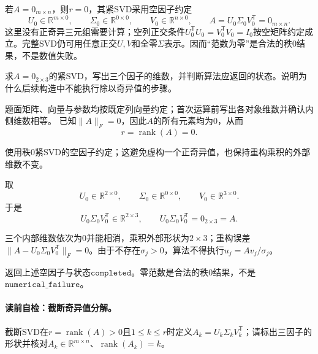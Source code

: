 \begin{definition}\label{def:V4-C03-rank-zero-svd}
若$A=0_{m\times n}$，则$r=0$，其紧SVD采用空因子约定
\[
U_0\in\mathbb R^{m\times0},\qquad
\Sigma_0\in\mathbb R^{0\times0},\qquad
V_0\in\mathbb R^{n\times0},\qquad
A=U_0\Sigma_0V_0^{\mathsf T}=0_{m\times n}.
\]
这里没有正奇异三元组需要计算；空列正交条件$U_0^{\mathsf T}U_0=V_0^{\mathsf T}V_0=I_0$按空矩阵约定成立。完整SVD仍可用任意正交$U,V$和全零$\Sigma$表示。因而“范数为零”是合法的秩$0$结果，不是数值失败。
\end{definition}

\begin{example}[零矩阵回归例]\label{exm:V4-C03-zero-svd}
求$A=0_{2\times3}$的紧SVD，写出三个因子的维数，并判断算法应返回的状态。说明为什么后续构造中不能执行除以奇异值的步骤。
\end{example}
\begin{solution}
\SolGiven 题面矩阵、向量与参数均按既定列向量约定；首次运算前写出各对象维数并确认内侧维数相等。
\SolDerive
\SolGiven 已知$\|A\|_F=0$，因此$A$的所有元素均为$0$，从而
\[
r=\operatorname{rank}(A)=0.
\]

\SolPlan 使用秩$0$紧SVD的空因子约定；这避免虚构一个正奇异值，也保持重构乘积的外部维数不变。

\SolDerive 取
\[
U_0\in\mathbb R^{2\times0},\qquad
\Sigma_0\in\mathbb R^{0\times0},\qquad
V_0\in\mathbb R^{3\times0}.
\]
于是
\[
U_0\Sigma_0V_0^{\mathsf T}
\in\mathbb R^{2\times3},
\qquad
U_0\Sigma_0V_0^{\mathsf T}=0_{2\times3}=A.
\]

\SolCheck 三个内部维数依次为$0$并能相消，乘积外部形状为$2\times3$；重构误差
$\|A-U_0\Sigma_0V_0^{\mathsf T}\|_F=0$。由于不存在$\sigma_j>0$，算法不得执行$u_j=Av_j/\sigma_j$。

\SolAnswer 返回上述空因子与状态$\mathtt{completed}$。零范数是合法的秩$0$结果，不是$\mathtt{numerical\_failure}$。
\end{solution}

\paragraph{读前自检：截断奇异值分解。}截断SVD在$r=\operatorname{rank}(A)>0$且$1\le k\le r$时定义$A_k=U_k\Sigma_kV_k^{\mathsf T}$；请标出三因子的形状并核对$A_k\in\mathbb R^{m\times n}$、$\operatorname{rank}(A_k)=k$。\par

